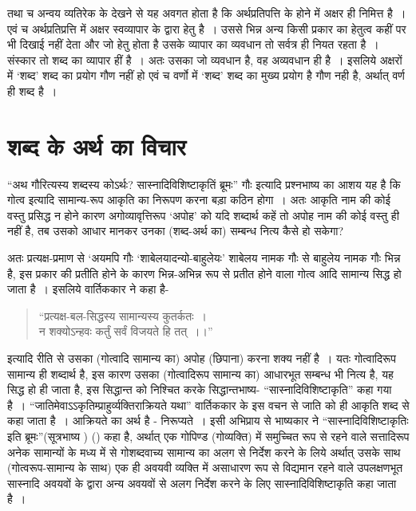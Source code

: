 तथा च अन्वय व्यतिरेक के देखने से यह अवगत होता है कि अर्थप्रतिपत्ति के होने में अक्षर ही निमित्त है~। एवं च अर्थप्रतिप्रत्ति में अक्षर स्वव्यापार के द्वारा हेतु है~। उससे भिन्न अन्य किसी प्रकार का हेतुत्व कहीं पर भी दिखाई नहीं देता और जो हेतु होता है उसके व्यापार का व्यवधान तो सर्वत्र ही नियत रहता है~। संस्कार तो शब्द का व्यापार हीं है~। अतः उसका जो व्यवधान है, वह अव्यवधान ही है~। इसलिये अक्षरों में ‘शब्द' शब्द का प्रयोग गौण नहीं हो एवं च वर्णो में ‘शब्द' शब्द का मुख्य प्रयोग है गौण नही है, अर्थात् वर्ण ही शब्द है~।


\section*{शब्द के अर्थ का विचार}

“अथ गौरित्यस्य शब्दस्य कोऽर्थः? सास्नादिविशिष्टाकृतिं ब्रूमः” गौः इत्यादि प्रश्नभाष्य का आशय यह है कि गोत्व इत्यादि सामान्य-रूप आकृति का निरूपण करना बड़ा कठिन होगा~। अतः आकृति नाम की कोई वस्तु प्रसिद्ध न होने कारण अगोव्यावृत्तिरूप ‘अपोह' को यदि शब्दार्थ कहें तो अपोह नाम की कोई वस्तु ही नहीं है, तब उसको आधार मानकर उनका (शब्द-अर्थ का) सम्बन्ध नित्य कैसे हो सकेगा?

\newpage

अतः प्रत्यक्ष-प्रमाण से ‘अयमपि गौः ‘शाबेलयादन्यो-बाहुलेयः' शाबेलय नामक गौः से बाहुलेय नामक गौः भिन्न है, इस प्रकार की प्रतीति होने के कारण भिन्न-अभिन्न रूप से प्रतीत होने वाला गोत्व आदि सामान्य सिद्ध हो जाता है~। इसलिये वार्तिककार ने कहा है-

\vskip 4pt

\begin{verse}
“प्रत्यक्ष-बल-सिद्धस्य सामान्यस्य कुतर्कतः~।\\न शक्योऽन्हवः कर्तुं सर्वं विजयते हि तत्~।।”
\end{verse}

\vskip 4pt

इत्यादि रीति से उसका (गोत्वादि सामान्य का) अपोह (छिपाना) करना शक्य नहीं है~। यतः गोत्वादिरूप सामान्य ही शब्दार्थ है, इस कारण उसका (गोत्वादिरूप सामान्य का) आधारभूत सम्बन्ध भी नित्य है, यह सिद्ध हो ही जाता है, इस सिद्धान्त को निश्चित करके सिद्धान्तभाष्य- “सास्नादिविशिष्टाकृति” कहा गया है~। “जातिमेवाऽऽकृतिम्प्राहुर्व्यक्तिराक्रियते यथा” वार्तिककार के इस वचन से जाति को ही आकृति शब्द से कहा जाता है~। आक्रियते का अर्थ है - निरूप्यते~। इसी अभिप्राय से भाष्यकार ने “सास्नादिविशिष्टाकृतिः इति ब्रूमः”(सूत्रभाष्य ) () कहा है, अर्थात् एक गोपिण्ड (गोव्यक्ति) में समुच्चित रूप से रहने वाले सत्तादिरूप अनेक सामान्यों के मध्य में से गोशब्दवाच्य सामान्य का अलग से निर्देश करने के लिये अर्थात् उसके साथ (गोत्वरूप-सामान्य के साथ) एक ही अवयवी व्यक्ति में असाधारण रूप से विद्यमान रहने वाले उपलक्षणभूत सास्नादि अवयवों के द्वारा अन्य अवयवों से अलग निर्देश करने के लिए सास्नादिविशिष्टाकृति कहा जाता है~।

